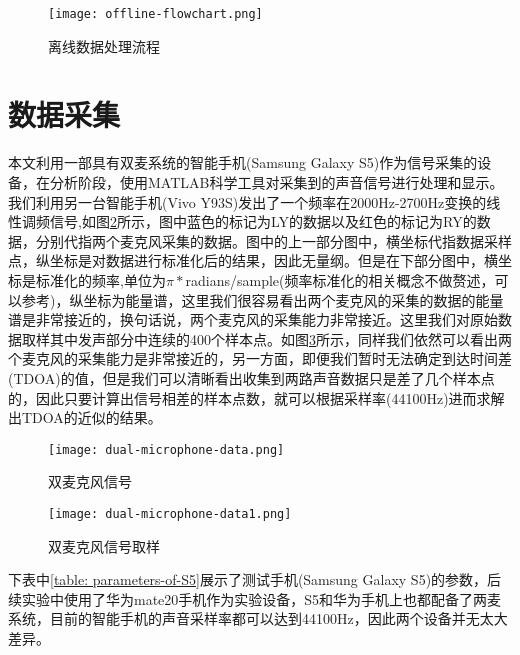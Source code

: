 \documentclass[winfonts]{njuthesis}
\begin{document}
		\begin{figure}[H]
			\centering
			\caption{离线数据处理流程}
			\texttt{[image: offline-flowchart.png]} 
			\label{fig: offline-flowchart}
		\end{figure}
	
	\section{数据采集}
	
		本文利用一部具有双麦系统的智能手机(Samsung Galaxy S5)作为信号采集的设备，在分析阶段，使用MATLAB科学工具对采集到的声音信号进行处理和显示。我们利用另一台智能手机(Vivo Y93S)发出了一个频率在2000Hz-2700Hz变换的线性调频信号,如图\ref{fig: dual-microphone-data}所示，图中蓝色的标记为LY的数据以及红色的标记为RY的数据，分别代指两个麦克风采集的数据。图中的上一部分图中，横坐标代指数据采样点，纵坐标是对数据进行标准化后的结果，因此无量纲。但是在下部分图中，横坐标是标准化的频率,单位为$\pi * $radians/sample(频率标准化的相关概念不做赘述，可以参考\cite{Normalized_frequency})，纵坐标为能量谱，这里我们很容易看出两个麦克风的采集的数据的能量谱是非常接近的，换句话说，两个麦克风的采集能力非常接近。这里我们对原始数据取样其中发声部分中连续的400个样本点。如图\ref{fig: dual-microphone-data1}所示，同样我们依然可以看出两个麦克风的采集能力是非常接近的，另一方面，即便我们暂时无法确定到达时间差(TDOA)的值，但是我们可以清晰看出收集到两路声音数据只是差了几个样本点的，因此只要计算出信号相差的样本点数，就可以根据采样率(44100Hz)进而求解出TDOA的近似的结果。
		
		\begin{figure}[H]
			\centering
			\texttt{[image: dual-microphone-data.png]} 
			\caption{双麦克风信号}
			\label{fig: dual-microphone-data}
		\end{figure}
	
		\begin{figure}[H]
			\centering
			\texttt{[image: dual-microphone-data1.png]} 
			\caption{双麦克风信号取样}
			\label{fig: dual-microphone-data1}
		\end{figure}
		
		下表中\ref{table: parameters-of-S5}展示了测试手机(Samsung Galaxy S5)的参数，后续实验中使用了华为mate20手机作为实验设备，S5和华为手机上也都配备了两麦系统，目前的智能手机的声音采样率都可以达到44100Hz，因此两个设备并无太大差异。
		
\end{document}
